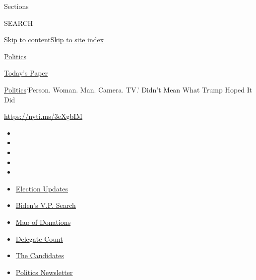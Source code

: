 Sections

SEARCH

\protect\hyperlink{site-content}{Skip to
content}\protect\hyperlink{site-index}{Skip to site index}

\href{https://www.nytimes.com/section/politics}{Politics}

\href{https://myaccount.nytimes.com/auth/login?response_type=cookie\&client_id=vi}{}

\href{https://www.nytimes.com/section/todayspaper}{Today's Paper}

\href{/section/politics}{Politics}\textbar{}`Person. Woman. Man. Camera.
TV.' Didn't Mean What Trump Hoped It Did

\url{https://nyti.ms/3eXgbIM}

\begin{itemize}
\item
\item
\item
\item
\item
\end{itemize}

\begin{itemize}
\item
  \href{https://www.nytimes.com/2020/07/31/us/elections/biden-vs-trump.html?action=click\&pgtype=Article\&state=default\&region=TOP_BANNER\&context=storylines_menu}{Election
  Updates}
\item
  \href{https://www.nytimes.com/article/biden-vice-president-2020.html?action=click\&pgtype=Article\&state=default\&region=TOP_BANNER\&context=storylines_menu}{Biden's
  V.P. Search}
\item
  \href{https://www.nytimes.com/interactive/2020/07/24/us/politics/trump-biden-campaign-donors.html?action=click\&pgtype=Article\&state=default\&region=TOP_BANNER\&context=storylines_menu}{Map
  of Donations}
\item
  \href{https://www.nytimes.com/interactive/2020/us/elections/delegate-count-primary-results.html?action=click\&pgtype=Article\&state=default\&region=TOP_BANNER\&context=storylines_menu}{Delegate
  Count}
\item
  \href{https://www.nytimes.com/interactive/2019/us/politics/2020-presidential-candidates.html?action=click\&pgtype=Article\&state=default\&region=TOP_BANNER\&context=storylines_menu}{The
  Candidates}
\item
  \href{https://www.nytimes.com/newsletters/politics?action=click\&pgtype=Article\&state=default\&region=TOP_BANNER\&context=storylines_menu}{Politics
  Newsletter}
\end{itemize}


